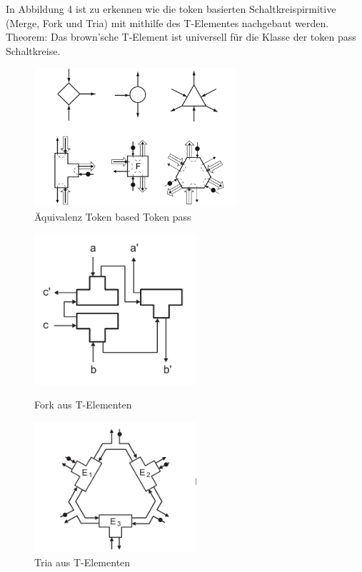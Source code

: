 \documentclass[11pt,a4paper]{article}
\begin{document}
In Abbildung 4 ist zu erkennen wie die token basierten Schaltkreispirmitive 
(Merge, Fork und Tria) mit mithilfe des T-Elementes nachgebaut werden.
%
Theorem: Das brown'sche T-Element ist universell für die Klasse der token pass 
Schaltkreise.

\begin{figure}[h]
    \centering 
    \centering
    \includegraphics[width=7.5cm]{bilder/BasedToPass.png}
    \caption{Äquivalenz Token based Token pass}
    \label{fig:BasedToPass}
\end{figure}


\begin{figure}[h]
     \begin{minipage}{0.45\textwidth}
        \centering
        \includegraphics[width=6cm]{bilder/TP_Fork.png}
        \caption{Fork aus T-Elementen}
    \end{minipage}\hfill
     \begin{minipage}{0.45\textwidth}
        \centering
        \includegraphics[width=6cm]{bilder/TP_Tria.png}
        \caption{Tria aus T-Elementen}
    \end{minipage}\hfill
\end{figure}    
\end{document}
